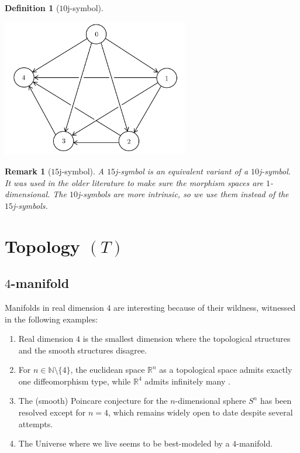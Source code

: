 \documentclass[12pt]{extarticle}
\numberwithin{equation}{section} %
\theoremstyle{mystyle}
\newtheorem{definition}[equation]{Definition}
\newtheorem{remark}[equation]{Remark}
\begin{document}
\begin{definition}[$10$j-symbol]
\begin{center}
    \includegraphics[height=6cm]{10j-geometric}
  \end{center}
\end{definition}

\begin{remark}[$15$j-symbol]\label{remark/15j-symbol}
  A $15$j-symbol is an equivalent variant of a $10$j-symbol. It
  was used in the older literature to make sure the morphism
  spaces are $1$-dimensional. The $10$j-symbols are more
  intrinsic, so we use them instead of the $15$j-symbols.
\end{remark}

\section{Topology $(T)$}\label{section/topology}
\subsection{$4$-manifold}

Manifolds in real dimension $4$ are interesting because of their
wildness, witnessed in the following examples:

\begin{enumerate}
  \item Real dimension $4$ is the smallest dimension where the
        topological structures and the smooth structures
        disagree.
  \item For $n \in \mathbb{N}\setminus\{4\}$, the euclidean space
        $\mathbb{R}^{n}$ as a topological space admits exactly
        one diffeomorphism type, while $\mathbb{R}^{4}$ admits
        infinitely many
        \cite{scorpan/the-wild-world-of-4-manifolds}\cite[p.2]{milnor/topological-manifolds-and-smooth-manifolds}.
  \item The (smooth) Poincare conjecture for the $n$-dimensional
        sphere $S^{n}$ has been resolved except for $n=4$, which
        remains widely open to date despite several attempts.
  \item The Universe where we live seems to be best-modeled by a
        $4$-manifold.
\end{enumerate}
\end{document}
